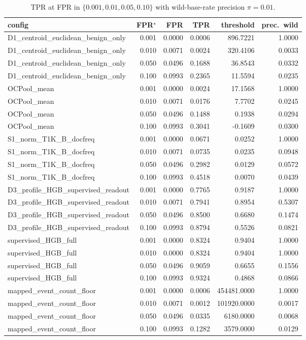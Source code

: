 \begin{table}[ht]
\centering
\caption{TPR at FPR in $\{0.001,0.01,0.05,0.10\}$ with wild-base-rate precision $\pi=0.01$.}
\label{tab:t7-op}
\begin{tabular}{lrrrrr}
\toprule
config & FPR$^\star$ & FPR & TPR & threshold & prec.\ wild \\
\midrule
D1\_centroid\_euclidean\_benign\_only & 0.001 & 0.0000 & 0.0006 & 896.7221 & 1.0000 \\
D1\_centroid\_euclidean\_benign\_only & 0.010 & 0.0071 & 0.0024 & 320.4106 & 0.0033 \\
D1\_centroid\_euclidean\_benign\_only & 0.050 & 0.0496 & 0.1688 & 36.8543 & 0.0332 \\
D1\_centroid\_euclidean\_benign\_only & 0.100 & 0.0993 & 0.2365 & 11.5594 & 0.0235 \\
OCPool\_mean & 0.001 & 0.0000 & 0.0024 & 17.1568 & 1.0000 \\
OCPool\_mean & 0.010 & 0.0071 & 0.0176 & 7.7702 & 0.0245 \\
OCPool\_mean & 0.050 & 0.0496 & 0.1488 & 0.1938 & 0.0294 \\
OCPool\_mean & 0.100 & 0.0993 & 0.3041 & -0.1609 & 0.0300 \\
S1\_norm\_T1K\_B\_docfreq & 0.001 & 0.0000 & 0.0671 & 0.0252 & 1.0000 \\
S1\_norm\_T1K\_B\_docfreq & 0.010 & 0.0071 & 0.0735 & 0.0235 & 0.0948 \\
S1\_norm\_T1K\_B\_docfreq & 0.050 & 0.0496 & 0.2982 & 0.0129 & 0.0572 \\
S1\_norm\_T1K\_B\_docfreq & 0.100 & 0.0993 & 0.4518 & 0.0070 & 0.0439 \\
D3\_profile\_HGB\_supervised\_readout & 0.001 & 0.0000 & 0.7765 & 0.9187 & 1.0000 \\
D3\_profile\_HGB\_supervised\_readout & 0.010 & 0.0071 & 0.7941 & 0.8954 & 0.5307 \\
D3\_profile\_HGB\_supervised\_readout & 0.050 & 0.0496 & 0.8500 & 0.6680 & 0.1474 \\
D3\_profile\_HGB\_supervised\_readout & 0.100 & 0.0993 & 0.8794 & 0.5526 & 0.0821 \\
supervised\_HGB\_full & 0.001 & 0.0000 & 0.8324 & 0.9404 & 1.0000 \\
supervised\_HGB\_full & 0.010 & 0.0000 & 0.8324 & 0.9404 & 1.0000 \\
supervised\_HGB\_full & 0.050 & 0.0496 & 0.9059 & 0.6655 & 0.1556 \\
supervised\_HGB\_full & 0.100 & 0.0993 & 0.9324 & 0.4868 & 0.0866 \\
mapped\_event\_count\_floor & 0.001 & 0.0000 & 0.0006 & 454481.0000 & 1.0000 \\
mapped\_event\_count\_floor & 0.010 & 0.0071 & 0.0012 & 101920.0000 & 0.0017 \\
mapped\_event\_count\_floor & 0.050 & 0.0496 & 0.0335 & 6180.0000 & 0.0068 \\
mapped\_event\_count\_floor & 0.100 & 0.0993 & 0.1282 & 3579.0000 & 0.0129 \\
\bottomrule
\end{tabular}
\end{table}
